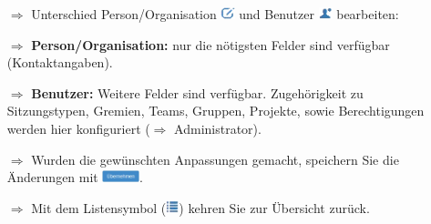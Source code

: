 \documentclass{article}
\begin{document}
\begin{multicols}{2}
\begin{tcolorbox}[colback=blue!5,colframe=blue!40!black,title={Personen/Organisationen, sowie Benutzer bearbeiten}]
\begin{itemize}
  \item[$\Longrightarrow$] Unterschied Person/Organisation \includegraphics[height=10pt]{Icons/bearbeiten.png} und Benutzer \includegraphics[height=10pt]{Icons/User.png} bearbeiten:
  \item[$\Longrightarrow$] \textbf{Person/Organisation:} nur die nötigsten Felder sind verfügbar (Kontaktangaben).
  \item[$\Longrightarrow$] \textbf{Benutzer:} Weitere Felder sind verfügbar. Zugehörigkeit zu Sitzungstypen, Gremien, Teams, Gruppen, Projekte, sowie Berechtigungen werden hier konfiguriert ($\Longrightarrow$ Administrator).
  \item[$\Longrightarrow$] Wurden die gewünschten Anpassungen gemacht, speichern Sie die Änderungen mit \includegraphics[height=10pt]{Icons/B_Uebernehmen.jpg}.
	\item[$\Longrightarrow$] Mit dem Listensymbol (\includegraphics[height=10pt]{Icons/Listensymbol_zurueck.png}) kehren Sie zur Übersicht zurück.
\end{itemize}
\end{tcolorbox}

\end{multicols}

\end{document}

